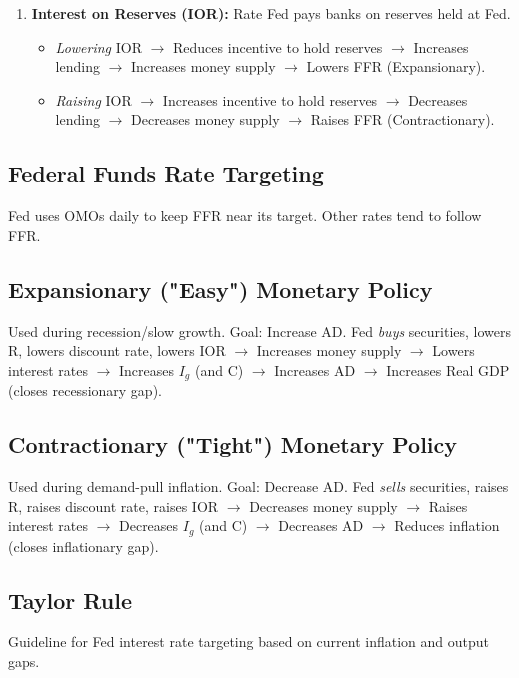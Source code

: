 \documentclass{article}
\begin{document}
\begin{enumerate}
\begin{itemize}
        \end{itemize}
    \item \textbf{Interest on Reserves (IOR):} Rate Fed pays banks on reserves held at Fed.
        \begin{itemize}
            \item \textit{Lowering} IOR $\rightarrow$ Reduces incentive to hold reserves $\rightarrow$ Increases lending $\rightarrow$ Increases money supply $\rightarrow$ Lowers FFR (Expansionary).
            \item \textit{Raising} IOR $\rightarrow$ Increases incentive to hold reserves $\rightarrow$ Decreases lending $\rightarrow$ Decreases money supply $\rightarrow$ Raises FFR (Contractionary).
        \end{itemize}
\end{enumerate}

\subsection*{Federal Funds Rate Targeting}
Fed uses OMOs daily to keep FFR near its target. Other rates tend to follow FFR.

\subsection*{Expansionary ("Easy") Monetary Policy}
Used during recession/slow growth. Goal: Increase AD. Fed \textit{buys} securities, lowers R, lowers discount rate, lowers IOR $\rightarrow$ Increases money supply $\rightarrow$ Lowers interest rates $\rightarrow$ Increases $I_g$ (and C) $\rightarrow$ Increases AD $\rightarrow$ Increases Real GDP (closes recessionary gap).

\subsection*{Contractionary ("Tight") Monetary Policy}
Used during demand-pull inflation. Goal: Decrease AD. Fed \textit{sells} securities, raises R, raises discount rate, raises IOR $\rightarrow$ Decreases money supply $\rightarrow$ Raises interest rates $\rightarrow$ Decreases $I_g$ (and C) $\rightarrow$ Decreases AD $\rightarrow$ Reduces inflation (closes inflationary gap).

\subsection*{Taylor Rule}
Guideline for Fed interest rate targeting based on current inflation and output gaps.
\end{document}
